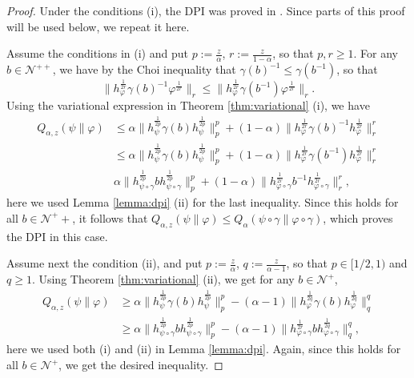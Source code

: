 \documentclass[12pt]{article}
\theoremstyle{definition}
\theoremstyle{remark}
\def\Ne{\mathcal N}
\begin{document}
\begin{proof} Under the conditions (i), the DPI was proved in \cite[Theorem 1
(viii)]{kato2023onrenyi}.
Since parts of this proof will be used below, we repeat it here.

 Assume the conditions in (i) and put $p:=\frac{z}{\alpha}$, $r:=\frac{z}{1-\alpha}$, so
 that  $p,r\ge 1$. 
For any   $b\in \Ne^{++}$, we have by  the Choi inequality \cite{choi1974aschwarz} 
that  $\gamma(b)^{-1}\le \gamma(b^{-1})$, so that  
\[
\|h_\varphi^{\frac{1}{2r}}\gamma(b)^{-1}\varphi^{\frac{1}{2r}}\|_r\le
\|h_\varphi^{\frac{1}{2r}}\gamma(b^{-1})\varphi^{\frac{1}{2r}}\|_r.
\]
Using the variational expression in Theorem \ref{thm:variational} (i), we have
\begin{align}\label{eq:dpif}
Q_{\alpha,z}(\psi\|\varphi)&\le \alpha\|h_\psi^{\frac{1}{2p}}\gamma(b)h_\psi^{\frac{1}{2p}}\|_p^p+
(1-\alpha)\|h_\varphi^{\frac{1}{2r}}\gamma(b)^{-1}h_\varphi^{\frac{1}{2r}}\|_r^r\\
&\le  \alpha\|h_\psi^{\frac{1}{2p}}\gamma(b)h_\psi^{\frac{1}{2p}}\|_p^p+
(1-\alpha)\|h_\varphi^{\frac{1}{2r}}\gamma(b^{-1})h_\varphi^{\frac{1}{2r}}\|_r^r\\
&  \alpha\|h_{\psi\circ\gamma}^{\frac{1}{2p}}bh_{\psi\circ\gamma}^{\frac{1}{2p}}\|_p^p+
(1-\alpha)\|h_{\varphi\circ\gamma}^{\frac{1}{2r}}b^{-1}h_{\varphi\circ\gamma}^{\frac{1}{2r}}\|_r^r,\label{eq:dpil}
\end{align}
here we used Lemma \ref{lemma:dpi} (ii) for the last inequality. Since this holds for all
$b\in \Ne^++$, it follows that $Q_{\alpha,z}(\psi\|\varphi)\le
Q_{\alpha}(\psi\circ\gamma\|\varphi\circ\gamma)$, which proves the DPI in this case.


Assume next the condition (ii), and put $p:=\frac{z}{\alpha}$, $q:=\frac{z}{\alpha-1}$, so
that $p\in [1/2,1)$ and $q\ge 1$. Using Theorem
\ref{thm:variational} (ii), we get for any $b\in \Ne^+$,
\begin{align*}
Q_{\alpha,z}(\psi\|\varphi)&\ge
\alpha\|h_\psi^{\frac{1}{2p}}\gamma(b)h_\psi^{\frac{1}{2p}}\|_p^p-
(\alpha-1)\|h_\varphi^{\frac{1}{2q}}\gamma(b)h_\varphi^{\frac{1}{2q}}\|_q^q\\
&\ge \alpha\|h_{\psi\circ\gamma}^{\frac{1}{2p}}bh_{\psi\circ\gamma}^{\frac{1}{2p}}\|_p^p-
(\alpha-1)\|h_{\varphi\circ\gamma}^{\frac{1}{2r}}bh_{\varphi\circ\gamma}^{\frac{1}{2q}}\|_q^q,
\end{align*}
here we used both (i) and (ii) in Lemma \ref{lemma:dpi}. Again, since this holds for all
$b\in \Ne^+$, we get the desired inequality.



\end{proof}
\end{document}
